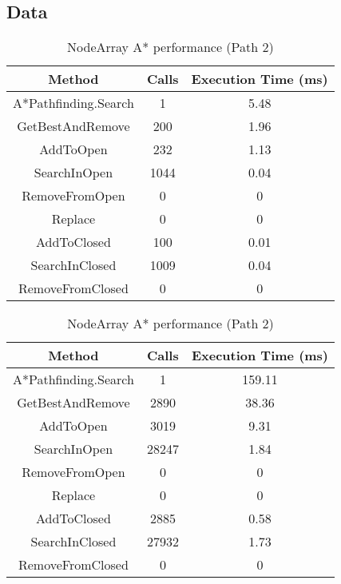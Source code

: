 \documentclass{article}
\begin{document}
  \subsection{Data}
  \begin{table}[h!]
    \parbox{.45\linewidth}{
      \centering
      \caption{NodeArray A* performance (Path 1)}
      \label{tab:tableNodeArray1}
      \begin{tabular}{c|c|c}
        \textbf{Method} & \textbf{Calls} & \textbf{Execution Time (ms)}\\
        \hline
        A*Pathfinding.Search  & 1 & 5.48\\
        GetBestAndRemove & 200 & 1.96\\
        AddToOpen & 232 & 1.13\\
        SearchInOpen & 1044 & 0.04\\
        RemoveFromOpen & 0 & 0\\
        Replace & 0 & 0\\
        AddToClosed & 100  & 0.01\\
        SearchInClosed & 1009 & 0.04\\
        RemoveFromClosed & 0 & 0\\
      \end{tabular}
    }
    \hfil
    \parbox{.45\linewidth}{
      \centering
      \label{tab:tableNodeArray2}
      \caption{NodeArray A* performance (Path 2)}
      \begin{tabular}{c|c|c}
        \textbf{Method} & \textbf{Calls} & \textbf{Execution Time (ms)}\\
        \hline
        A*Pathfinding.Search  & 1 & 159.11\\
        GetBestAndRemove & 2890 & 38.36\\
        AddToOpen & 3019 & 9.31\\
        SearchInOpen & 28247 & 1.84\\
        RemoveFromOpen & 0 & 0\\
        Replace & 0 & 0\\
        AddToClosed & 2885 & 0.58\\
        SearchInClosed & 27932  & 1.73\\
        RemoveFromClosed & 0 & 0\\
      \end{tabular}
    }
  \end{table}
\end{document}
